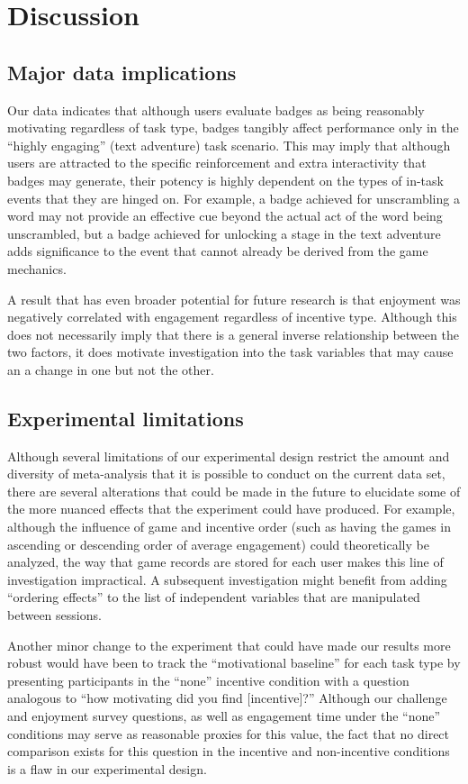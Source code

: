\section{Discussion}

\subsection{Major data implications}
Our data indicates that although users evaluate badges as being reasonably motivating regardless of task type, badges tangibly affect performance only in the “highly engaging” (text adventure) task scenario. This may imply that although users are attracted to the specific reinforcement and extra interactivity that badges may generate, their potency is highly dependent on the types of in-task events that they are hinged on. For example, a badge achieved for unscrambling a word may not provide an effective cue beyond the actual act of the word being unscrambled, but a badge achieved for unlocking a stage in the text adventure adds significance to the event that cannot already be derived from the game mechanics.

A result that has even broader potential for future research is that enjoyment was negatively correlated with engagement regardless of incentive type. Although this does not necessarily imply that there is a general inverse relationship between the two factors, it does motivate investigation into the task variables that may cause an a change in one but not the other. 

\subsection{Experimental limitations}
Although several limitations of our experimental design restrict the amount and diversity of meta-analysis that it is possible to conduct on the current data set, there are several alterations that could be made in the future to elucidate some of the more nuanced effects that the experiment could have produced. For example, although the influence of game and incentive order (such as having the games in ascending or descending order of average engagement) could theoretically be analyzed, the way that game records are stored for each user makes this line of investigation impractical. A subsequent investigation might benefit from adding “ordering effects” to the list of independent variables that are manipulated between sessions. 

Another minor change to the experiment that could have made our results more robust would have been to track the “motivational baseline” for each task type by presenting participants in the “none” incentive condition with a question analogous to “how motivating did you find [incentive]?” Although our challenge and enjoyment survey questions, as well as engagement time under the “none” conditions may serve as reasonable proxies for this value, the fact that no direct comparison exists for this question in the incentive and non-incentive conditions is a flaw in our experimental design.

